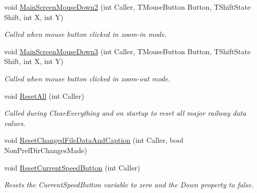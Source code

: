 \begin{DoxyCompactItemize}
\mbox{\label{class_t_interface_abf07d5edc1507de381825f17620748b2}} 
void \mbox{\hyperlink{class_t_interface_abf07d5edc1507de381825f17620748b2}{Main\+Screen\+Mouse\+Down2}} (int Caller, T\+Mouse\+Button Button, T\+Shift\+State Shift, int X, int Y)
\begin{DoxyCompactList}\small\item\em Called when mouse button clicked in zoom-\/in mode. \end{DoxyCompactList}\item 
\mbox{\label{class_t_interface_a8c96de45b013362b03ad0e8725a7c64b}} 
void \mbox{\hyperlink{class_t_interface_a8c96de45b013362b03ad0e8725a7c64b}{Main\+Screen\+Mouse\+Down3}} (int Caller, T\+Mouse\+Button Button, T\+Shift\+State Shift, int X, int Y)
\begin{DoxyCompactList}\small\item\em Called when mouse button clicked in zoom-\/out mode. \end{DoxyCompactList}\item 
\mbox{\label{class_t_interface_ac5e079dc6f8023485367f6db2e693caa}} 
void \mbox{\hyperlink{class_t_interface_ac5e079dc6f8023485367f6db2e693caa}{Reset\+All}} (int Caller)
\begin{DoxyCompactList}\small\item\em Called during Clear\+Everything and on startup to reset all major railway data values. \end{DoxyCompactList}\item 
void \mbox{\hyperlink{class_t_interface_a397ecca8b2fb1f85b265938a4e565de4}{Reset\+Changed\+File\+Data\+And\+Caption}} (int Caller, bool Non\+Pref\+Dir\+Changes\+Made)
\item 
\mbox{\label{class_t_interface_ad91195c1ea742572c4579ea38fbd4eb3}} 
void \mbox{\hyperlink{class_t_interface_ad91195c1ea742572c4579ea38fbd4eb3}{Reset\+Current\+Speed\+Button}} (int Caller)
\begin{DoxyCompactList}\small\item\em Resets the Current\+Speed\+Button variable to zero and the \textquotesingle{}Down\textquotesingle{} property to false. \end{DoxyCompactList}\item 
\mbox{\label{class_t_interface_a970fd0fd4d725c80c6e2c4cd0c27cf0c}} 

\end{DoxyCompactItemize}
